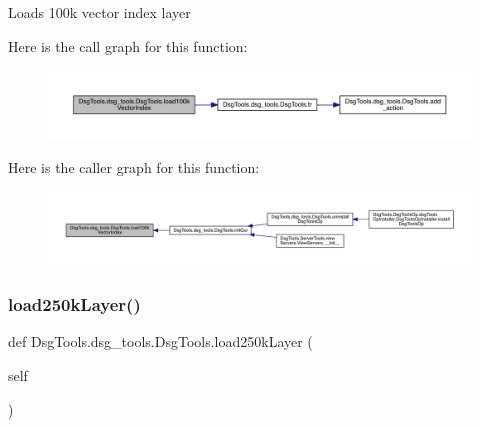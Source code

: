 \begin{DoxyVerb}Loads 100k vector index layer
\end{DoxyVerb}
 Here is the call graph for this function\+:
\nopagebreak
\begin{figure}[H]
\begin{center}
\leavevmode
\includegraphics[width=350pt]{class_dsg_tools_1_1dsg__tools_1_1_dsg_tools_af2223d0e1978719114b07789d36eeb53_cgraph}
\end{center}
\end{figure}
Here is the caller graph for this function\+:
\nopagebreak
\begin{figure}[H]
\begin{center}
\leavevmode
\includegraphics[width=350pt]{class_dsg_tools_1_1dsg__tools_1_1_dsg_tools_af2223d0e1978719114b07789d36eeb53_icgraph}
\end{center}
\end{figure}
\mbox{\label{class_dsg_tools_1_1dsg__tools_1_1_dsg_tools_ae2142392ed294e7274cbdbe1421c316c}} 
\subsubsection{\texorpdfstring{load250k\+Layer()}{load250kLayer()}}
{\footnotesize\ttfamily def Dsg\+Tools.\+dsg\+\_\+tools.\+Dsg\+Tools.\+load250k\+Layer (\begin{DoxyParamCaption}\item[{}]{self }\end{DoxyParamCaption})}

